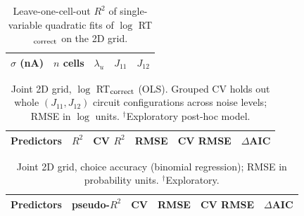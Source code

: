 \documentclass[11pt]{article}
\begin{document}
	\begin{table}[t]\centering\small
		\begin{tabular}{rcccc}\toprule
			$\sigma$ (nA) & $n$ cells & $\lambda_u$ & $J_{11}$ & $J_{12}$\\\midrule
			
		\end{tabular}
		\caption{Leave-one-cell-out $R^2$ of single-variable quadratic fits of $\log$ RT$_{\rm correct}$ on the 2D grid.}
		\label{tab:collapse}
	\end{table}
	\begin{table}[t]\centering\footnotesize
		\begin{tabular}{lccccc}\toprule
			Predictors & $R^2$ & CV $R^2$ & RMSE & CV RMSE & $\Delta$AIC\\\midrule
			
		\end{tabular}
		\caption{Joint 2D grid, $\log$ RT$_{\rm correct}$ (OLS). Grouped CV holds out whole $(J_{11},J_{12})$ circuit configurations across noise levels; RMSE in $\log$ units. $^\dagger$Exploratory post-hoc model.}
		\label{tab:2drt}
	\end{table}
	\begin{table}[t]\centering\footnotesize
		\begin{tabular}{lccccc}\toprule
			Predictors & pseudo-$R^2$ & CV & RMSE & CV RMSE & $\Delta$AIC\\\midrule
			
		\end{tabular}
		\caption{Joint 2D grid, choice accuracy (binomial regression); RMSE in probability units. $^\dagger$Exploratory.}
		\label{tab:2dacc}
	\end{table}
	
\end{document}

